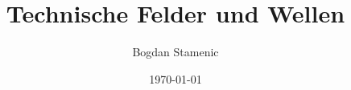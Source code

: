 

\newcommand{\FormelsammlungTitel}{Technische Felder und Wellen}
\newcommand{\FormelsammlungAutor}{Bogdan Stamenic}
\setcounter{tocdepth}{2} %


	\title{\FormelsammlungTitel}
	\author{\FormelsammlungAutor}
	\date{\today}
	

